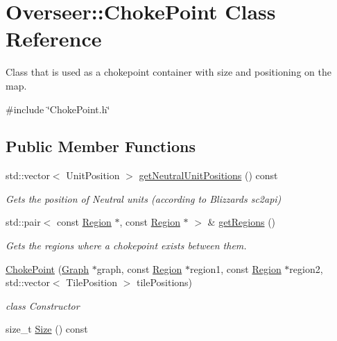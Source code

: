 \hypertarget{classOverseer_1_1ChokePoint}{}\section{Overseer\+:\+:Choke\+Point Class Reference}
\label{classOverseer_1_1ChokePoint}


Class that is used as a chokepoint container with size and positioning on the map.  




{\ttfamily \#include \char`\"{}Choke\+Point.\+h\char`\"{}}

\subsection*{Public Member Functions}
\begin{DoxyCompactItemize}
\item 
std\+::vector$<$ Unit\+Position $>$ \hyperlink{classOverseer_1_1ChokePoint_a94f3028b9d3ea8630500f721d6fa036d}{get\+Neutral\+Unit\+Positions} () const 
\begin{DoxyCompactList}\small\item\em Gets the position of Neutral units (according to Blizzard\textquotesingle{}s sc2api) \end{DoxyCompactList}\item 
std\+::pair$<$ const \hyperlink{classOverseer_1_1Region}{Region} $\ast$, const \hyperlink{classOverseer_1_1Region}{Region} $\ast$ $>$ \& \hyperlink{classOverseer_1_1ChokePoint_aa01d980ee19449f5e4557b8bc036a4e7}{get\+Regions} ()
\begin{DoxyCompactList}\small\item\em Gets the regions where a chokepoint exists between them. \end{DoxyCompactList}\item 
\hyperlink{classOverseer_1_1ChokePoint_a931b3cd819ec712833ae3857dcab4f7a}{Choke\+Point} (\hyperlink{classOverseer_1_1Graph}{Graph} $\ast$graph, const \hyperlink{classOverseer_1_1Region}{Region} $\ast$region1, const \hyperlink{classOverseer_1_1Region}{Region} $\ast$region2, std\+::vector$<$ Tile\+Position $>$ tile\+Positions)
\begin{DoxyCompactList}\small\item\em class Constructor \end{DoxyCompactList}\item 
size\+\_\+t \hyperlink{classOverseer_1_1ChokePoint_a7fd40fd88577c1bbf5c462fe03485f15}{Size} () const 

\end{DoxyCompactItemize}
